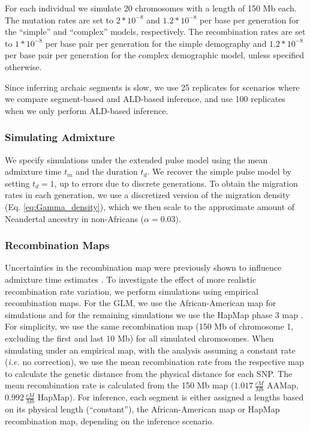 \documentclass[11pt]{article}
\begin{document}
For each individual we simulate 20
chromosomes with a length of 150 Mb each. The mutation rates are set to
 \(2*10^{-8}\) and \(1.2*10^{-8}\) per base per generation for the ``simple'' and ``complex'' models, respectively. The
recombination rates are set to \(1*10^{-8}\) per base pair per generation for the simple demography and \(1.2*10^{-8}\) per base pair per generation for the complex demographic model, unless specified otherwise. 

Since inferring archaic segments is slow, we use 25 replicates for scenarios where we compare segment-based and ALD-based inference, and use 100 replicates when we only perform ALD-based inference. 


\subsubsection{Simulating Admixture}\label{Simulating the expanded pulse}
We specify simulations under the extended pulse model using the mean admixture time $t_m$ and the duration $t_d$. We recover the simple pulse model by setting $t_d=1$, up to errors due to discrete generations. To obtain the migration rates in each generation, we use a discretized version of the migration density (Eq. \ref{eq:Gamma_density}), which we then scale to the approximate amount of Neandertal ancestry in non-Africans ($\alpha = 0.03$). 

\subsubsection{Recombination Maps}\label{recombination map}
Uncertainties in the recombination map were previously shown to influence admixture time estimates \citep{sankararaman_date_2012,fu_genome_2014,sankararaman_combined_2016}. To investigate the effect of more realistic
recombination rate variation, we perform simulations using empirical recombination maps. For the GLM, we use the  African-American map \citep{hinch_landscape_2011} for simulations and for the remaining simulations we use the HapMap phase 3 map \citep{HapMapConsortium_second_2007}. For simplicity, we use the same
recombination map (150 Mb of chromosome 1, excluding the first and last 10 Mb)
for all simulated chromosomes. When simulating under an empirical map, with the analysis assuming a constant rate (\emph{i.e.} no correction), we use the mean recombination rate from the respective map to calculate the genetic distance from the physical distance for each SNP. The mean recombination rate is
calculated from the 150 Mb map (\(1.017 \, \frac{cM}{Mb}\) AAMap,
\(0.992 \, \frac{cM}{Mb}\) HapMap). For inference, each segment is either assigned a lengths based on its physical length (``constant''), the African-American map or HapMap recombination map, depending on the inference scenario.
\end{document}
